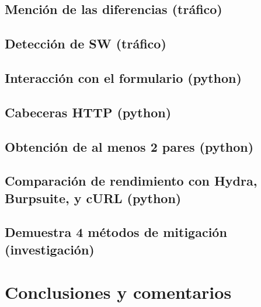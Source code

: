 \documentclass[letter,12pt]{article}
\begin{document}
\subsection{Mención de las diferencias (tráfico)}

\subsection{Detección de SW (tráfico)}

\subsection{Interacción con el formulario (python)}

\subsection{Cabeceras HTTP (python)}

\subsection{Obtención de al menos 2 pares (python)}

\subsection{Comparación de rendimiento con Hydra, Burpsuite, y cURL (python)}

\newpage
\subsection{Demuestra 4 métodos de mitigación (investigación)}


\section*{Conclusiones y comentarios}
\end{document}
